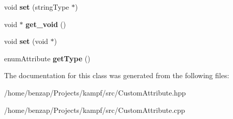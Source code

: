 \begin{DoxyCompactItemize}
\item 
\hypertarget{classCustomAttribute_a177471c70d2f20231a04de52366105eb}{void {\bfseries set} (string\-Type $\ast$)}\label{classCustomAttribute_a177471c70d2f20231a04de52366105eb}

\item 
\hypertarget{classCustomAttribute_aad6b1bad10318d322e6e9038f8090497}{void $\ast$ {\bfseries get\-\_\-void} ()}\label{classCustomAttribute_aad6b1bad10318d322e6e9038f8090497}

\item 
\hypertarget{classCustomAttribute_a96e3044d193ec5b74dffa70259583625}{void {\bfseries set} (void $\ast$)}\label{classCustomAttribute_a96e3044d193ec5b74dffa70259583625}

\item 
\hypertarget{classCustomAttribute_a2343901d334a51811991e2fc36ab3406}{enum\-Attribute {\bfseries get\-Type} ()}\label{classCustomAttribute_a2343901d334a51811991e2fc36ab3406}

\end{DoxyCompactItemize}


The documentation for this class was generated from the following files\-:\begin{DoxyCompactItemize}
\item 
/home/benzap/\-Projects/kampf/src/Custom\-Attribute.\-hpp\item 
/home/benzap/\-Projects/kampf/src/Custom\-Attribute.\-cpp\end{DoxyCompactItemize}
